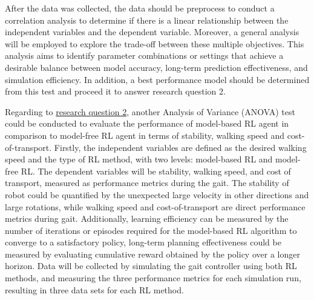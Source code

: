 After the data was collected, the data should be preprocess to conduct a correlation analysis to determine if there is a linear relationship between the independent variables and the dependent variable. Moreover, a general analysis will be employed to explore the trade-off between these multiple objectives. This analysis aims to identify parameter combinations or settings that achieve a desirable balance between model accuracy, long-term prediction effectiveness, and simulation efficiency. In addition, a best performance model should be determined from this test and proceed it to answer research question 2. 

Regarding to \hyperref[rq2]{research question 2}, another Analysis of Variance (ANOVA) test could be conducted to evaluate the performance of model-based RL agent in comparison to model-free RL agent in terms of stability, walking speed and cost-of-transport. Firstly, the independent variables are defined as the desired walking speed and the type of RL method, with two levels: model-based RL and model-free RL. The dependent variables will be stability, walking speed, and cost of transport, measured as performance metrics during the gait. The stability of robot could be quantified by the unexpected large velocity in other directions and large rotations, while walking speed and cost-of-transport are direct performance metrics during gait. Additionally, learning efficiency can be measured by the number of iterations or episodes required for the model-based RL algorithm to converge to a satisfactory policy, long-term planning effectiveness could be measured by evaluating cumulative reward obtained by the policy over a longer horizon. Data will be collected by simulating the gait controller using both RL methods, and measuring the three performance metrics for each simulation run, resulting in three data sets for each RL method. 
